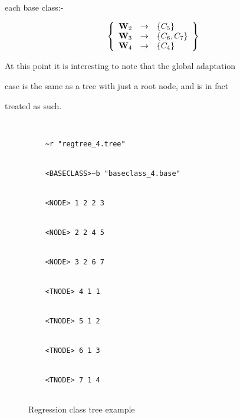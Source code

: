 each base class:-


\[


        \left\{


        \begin{array}{ccl}


                {\bf W}_2 & \rightarrow & \left\{C_5\right\} \\


                {\bf W}_3 & \rightarrow & \left\{C_6, C_7\right\} \\


                {\bf W}_4 & \rightarrow & \left\{C_4\right\}


        \end{array}


        \right\}


\]





At this point it is interesting to note that the global adaptation


case is the same as a tree with just a root node, and is in fact


treated as such.





\begin{center}


\begin{figure}


\begin{verbatim}


    ~r "regtree_4.tree"


    <BASECLASS>~b "baseclass_4.base"


    <NODE> 1 2 2 3 


    <NODE> 2 2 4 5 


    <NODE> 3 2 6 7 


    <TNODE> 4 1 1


    <TNODE> 5 1 2


    <TNODE> 6 1 3


    <TNODE> 7 1 4


\end{verbatim}


\caption{Regression class tree example}


\label{fig:regtree}


\end{figure}


\end{center}


